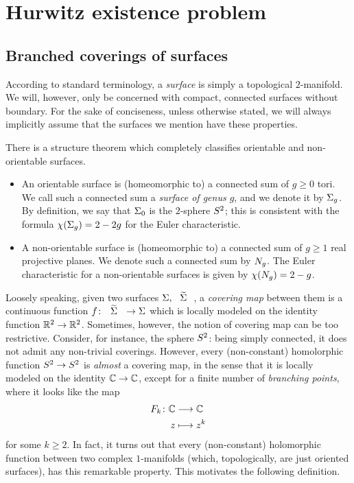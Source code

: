 \chapter{Hurwitz existence problem}

\section{Branched coverings of surfaces}

According to standard terminology, a \emph{surface} is simply a topological $2$-manifold. We will, however, only be concerned with compact, connected surfaces without boundary. For the sake of conciseness, unless otherwise stated, we will always implicitly assume that the surfaces we mention have these properties.

There is a structure theorem which completely classifies orientable and non-orientable surfaces.
\begin{itemize}
\item An orientable surface is (homeomorphic to) a connected sum of $g\ge 0$ tori. We call such a connected sum a \emph{surface of genus $g$}, and we denote it by $\Sigma_{g}$. By definition, we say that $\Sigma_{0}$ is the $2$-sphere $S^2{}$; this is consistent with the formula $\chi(\Sigma_{g})=2-2g$ for the Euler characteristic.
\item A non-orientable surface is (homeomorphic to) a connected sum of $g\ge 1$ real projective planes. We denote such a connected sum by $N_{g}$. The Euler characteristic for a non-orientable surfaces is given by $\chi(N_{g})=2-g$.
\end{itemize}

Loosely speaking, given two surfaces $\Sigma,\tSigma$, a \emph{covering map} between them is a continuous function $\map{f}{\tSigma}{\Sigma}$ which is locally modeled on the identity function $\umap{\RR^2}{\RR^2}$. Sometimes, however, the notion of covering map can be too restrictive. Consider, for instance, the sphere $S^2{}$: being simply connected, it does not admit any non-trivial coverings. However, every (non-constant) homolorphic function $\umap{\sphere{}}{\sphere{}}$ is \emph{almost} a covering map, in the sense that it is locally modeled on the identity $\umap{\CC}{\CC}$, except for a finite number of \emph{branching points}, where it looks like the map
\[
\begin{alignedat}{2} F_k\colon&&\mathbb{C}&\longrightarrow\mathbb{C}\\ &&z&\longmapsto z^k \end{alignedat}
\]
for some $k\ge 2$. In fact, it turns out that every (non-constant) holomorphic function between two complex $1$-manifolds (which, topologically, are just oriented surfaces), has this remarkable property. This motivates the following definition.


